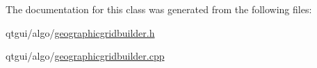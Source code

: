 The documentation for this class was generated from the following files\+:\begin{DoxyCompactItemize}
\item 
qtgui/algo/\mbox{\hyperlink{geographicgridbuilder_8h}{geographicgridbuilder.\+h}}\item 
qtgui/algo/\mbox{\hyperlink{geographicgridbuilder_8cpp}{geographicgridbuilder.\+cpp}}\end{DoxyCompactItemize}
